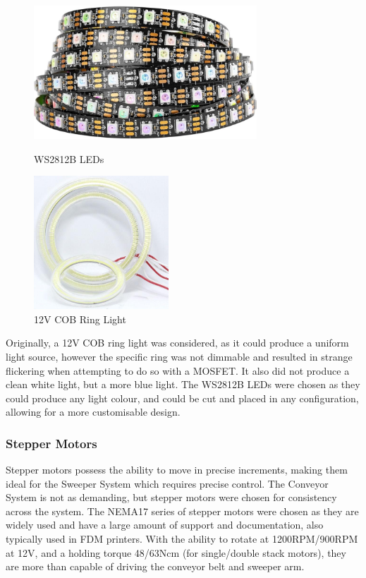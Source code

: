 \begin{figure}[H]
    \hfill
    \begin{minipage}[t]{0.45\textwidth}
      \centering
      \includegraphics[width=\textwidth,height=5cm, keepaspectratio]{imgs/parts/ws2812b.jpg}
        \caption{WS2812B LEDs \cite{ws2812b}}
    \end{minipage}
    \hfill
    \begin{minipage}[t]{0.45\textwidth}
        \centering
        \includegraphics[width=\textwidth,height=5cm, keepaspectratio]{imgs/parts/cob.jpeg}
        \caption{12V COB Ring Light}
      \end{minipage}
      \hfill
\end{figure}

Originally, a 12V COB ring light was considered, as it could produce a uniform light source, however the specific ring was not dimmable and resulted in strange flickering when attempting to do so with a MOSFET. It also did not produce a clean white light, but a more blue light. The WS2812B LEDs were chosen as they could produce any light colour, and could be cut and placed in any configuration, allowing for a more customisable design.

\subsubsection{Stepper Motors}
Stepper motors possess the ability to move in precise increments, making them ideal for the Sweeper System which requires precise control. The Conveyor System is not as demanding, but stepper motors were chosen for consistency across the system. The NEMA17 series of stepper motors were chosen \cite{nema17} as they are widely used and have a large amount of support and documentation, also typically used in FDM printers. With the ability to rotate at 1200RPM/900RPM at 12V, and a holding torque 48/63Ncm (for single/double stack motors), they are more than capable of driving the conveyor belt and sweeper arm.

